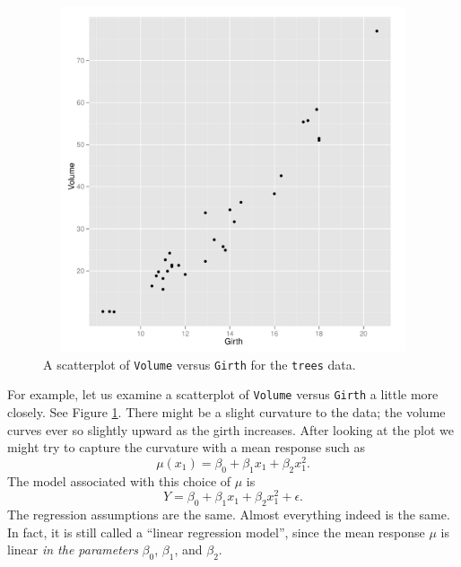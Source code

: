 \documentclass[captions=tableheading]{scrbook}
\begin{document}
\begin{figure}[ht!]
    \includegraphics[width=5in, height=4in]{img/Scatterplot-Volume-Girth-trees.pdf}
    \caption[Scatterplot of \texttt{Volume} versus \texttt{Girth} for the \texttt{trees} data]{\small A scatterplot of \texttt{Volume} versus \texttt{Girth} for the \texttt{trees} data.}
    \label{fig:Scatterplot-Volume-Girth-trees}
  \end{figure}

For example, let us examine a scatterplot of \texttt{Volume} versus \texttt{Girth} a little more closely. See Figure \ref{fig:Scatterplot-Volume-Girth-trees}. There might be a slight curvature to the data; the volume curves ever so slightly upward as the girth increases. After looking at the plot we might try to capture the curvature with a mean response such as 
\begin{equation}
\mu(x_{1})=\beta_{0}+\beta_{1}x_{1}+\beta_{2}x_{1}^{2}.
\end{equation}
The model associated with this choice of $\mu$ is
\begin{equation}
Y=\beta_{0}+\beta_{1}x_{1}+\beta_{2}x_{1}^{2}+\epsilon.
\end{equation}
The regression assumptions are the same. Almost everything indeed is the same. In fact, it is still called a ``linear regression model'', since the mean response $\mu$ is linear \emph{in the parameters} $\beta_{0}$, $\beta_{1}$, and $\beta_{2}$. 
\end{document}
